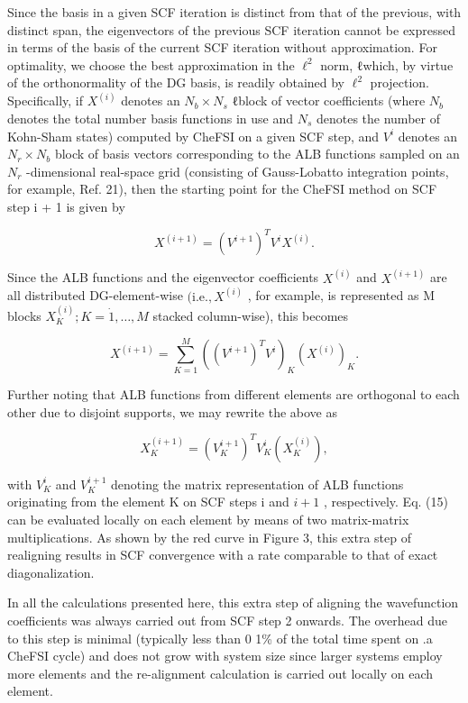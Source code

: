 \documentclass[
  10
]{article}
\begin{document}
Since the basis in a given SCF iteration is distinct from that of the
previous, with distinct span, the eigenvectors of the previous SCF
iteration cannot be expressed in terms of the basis of the current SCF
iteration without approximation. For optimality, we choose the best
approximation in the \(\ell ^ { 2 }\) norm, ℓwhich, by virtue of the
orthonormality of the DG basis, is readily obtained by \(\ell ^ { 2 }\)
projection. Specifically, if \(X ^ { ( i ) }\) denotes an
\(N _ { b } \times N _ { s }\) ℓblock of vector coefficients (where
\(N _ { b }\) denotes the total number basis functions in use and
\(N _ { s }\) denotes the number of Kohn-Sham states) computed by CheFSI
on a given SCF step, and \(V ^ { i }\) denotes an
\(N _ { r } \times N _ { b }\) block of basis vectors corresponding to
the ALB functions sampled on an \(N _ { r }\) -dimensional real-space
grid (consisting of Gauss-Lobatto integration points, for example, Ref.
21), then the starting point for the CheFSI method on SCF step i + 1 is
given by

\[
X ^ {(i + 1)} = (V ^ {i + 1}) ^ {T} V ^ {i} X ^ {(i)}. \tag {13}
\]

Since the ALB functions and the eigenvector coefficients
\(X ^ { ( i ) }\) and \(X ^ { ( i + 1 ) }\) are all distributed
DG-element-wise \(( \mathrm { i } . \mathrm { e } . , X ^ { ( i ) }\) ,
for example, is represented as M blocks
\(X _ { K } ^ { ( i ) } ; K = \dot { 1 } , \ldots , M\) stacked
column-wise), this becomes

\[
X ^ {(i + 1)} = \sum_ {K = 1} ^ {M} \left((V ^ {i + 1}) ^ {T} V ^ {i}\right) _ {K} (X ^ {(i)}) _ {K}. \tag {14}
\]

Further noting that ALB functions from different elements are orthogonal
to each other due to disjoint supports, we may rewrite the above as

\[
X _ {K} ^ {(i + 1)} = (V _ {K} ^ {i + 1}) ^ {T} V _ {K} ^ {i} (X _ {K} ^ {(i)}), \tag {15}
\]

with \(V _ { K } ^ { i }\) and \(V _ { K } ^ { i + 1 }\) denoting the
matrix representation of ALB functions originating from the element K on
SCF steps i and \(i + 1\) , respectively. Eq. (15) can be evaluated
locally on each element by means of two matrix-matrix multiplications.
As shown by the red curve in Figure 3, this extra step of realigning
results in SCF convergence with a rate comparable to that of exact
diagonalization.

In all the calculations presented here, this extra step of aligning the
wavefunction coefficients was always carried out from SCF step 2
onwards. The overhead due to this step is minimal (typically less than 0
1\% of the total time spent on .a CheFSI cycle) and does not grow with
system size since larger systems employ more elements and the
re-alignment calculation is carried out locally on each element.
\end{document}
